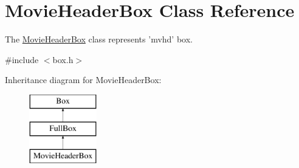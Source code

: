 \hypertarget{class_movie_header_box}{\section{Movie\-Header\-Box Class Reference}
\label{class_movie_header_box}
}


The \hyperlink{class_movie_header_box}{Movie\-Header\-Box} class represents 'mvhd' box.  




{\ttfamily \#include $<$box.\-h$>$}

Inheritance diagram for Movie\-Header\-Box\-:\begin{figure}[H]
\begin{center}
\leavevmode
\includegraphics[height=3.000000cm]{class_movie_header_box}
\end{center}
\end{figure}
